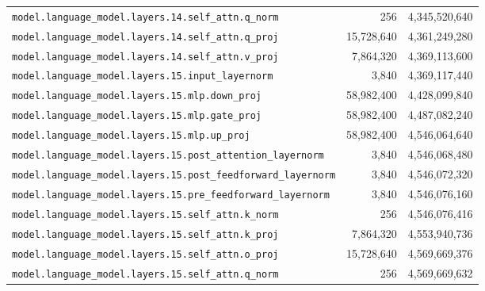 \documentclass[10pt,a4paper]{article}
\theoremstyle{definition}
\begin{document}
\begin{appendices}
\begin{longtable}{p{9.5cm}rr}
\texttt{model.\allowbreak{}language\_model.\allowbreak{}layers.\allowbreak{}14.\allowbreak{}self\_attn.\allowbreak{}q\_norm} & 256 & 4,345,520,640 \\
\texttt{model.\allowbreak{}language\_model.\allowbreak{}layers.\allowbreak{}14.\allowbreak{}self\_attn.\allowbreak{}q\_proj} & 15,728,640 & 4,361,249,280 \\
\texttt{model.\allowbreak{}language\_model.\allowbreak{}layers.\allowbreak{}14.\allowbreak{}self\_attn.\allowbreak{}v\_proj} & 7,864,320 & 4,369,113,600 \\
\texttt{model.\allowbreak{}language\_model.\allowbreak{}layers.\allowbreak{}15.\allowbreak{}input\_layernorm} & 3,840 & 4,369,117,440 \\
\texttt{model.\allowbreak{}language\_model.\allowbreak{}layers.\allowbreak{}15.\allowbreak{}mlp.\allowbreak{}down\_proj} & 58,982,400 & 4,428,099,840 \\
\texttt{model.\allowbreak{}language\_model.\allowbreak{}layers.\allowbreak{}15.\allowbreak{}mlp.\allowbreak{}gate\_proj} & 58,982,400 & 4,487,082,240 \\
\texttt{model.\allowbreak{}language\_model.\allowbreak{}layers.\allowbreak{}15.\allowbreak{}mlp.\allowbreak{}up\_proj} & 58,982,400 & 4,546,064,640 \\
\texttt{model.\allowbreak{}language\_model.\allowbreak{}layers.\allowbreak{}15.\allowbreak{}post\_attention\_layernorm} & 3,840 & 4,546,068,480 \\
\texttt{model.\allowbreak{}language\_model.\allowbreak{}layers.\allowbreak{}15.\allowbreak{}post\_feedforward\_layernorm} & 3,840 & 4,546,072,320 \\
\texttt{model.\allowbreak{}language\_model.\allowbreak{}layers.\allowbreak{}15.\allowbreak{}pre\_feedforward\_layernorm} & 3,840 & 4,546,076,160 \\
\texttt{model.\allowbreak{}language\_model.\allowbreak{}layers.\allowbreak{}15.\allowbreak{}self\_attn.\allowbreak{}k\_norm} & 256 & 4,546,076,416 \\
\texttt{model.\allowbreak{}language\_model.\allowbreak{}layers.\allowbreak{}15.\allowbreak{}self\_attn.\allowbreak{}k\_proj} & 7,864,320 & 4,553,940,736 \\
\texttt{model.\allowbreak{}language\_model.\allowbreak{}layers.\allowbreak{}15.\allowbreak{}self\_attn.\allowbreak{}o\_proj} & 15,728,640 & 4,569,669,376 \\
\texttt{model.\allowbreak{}language\_model.\allowbreak{}layers.\allowbreak{}15.\allowbreak{}self\_attn.\allowbreak{}q\_norm} & 256 & 4,569,669,632 \\

\end{longtable}
\end{appendices}
\end{document}
